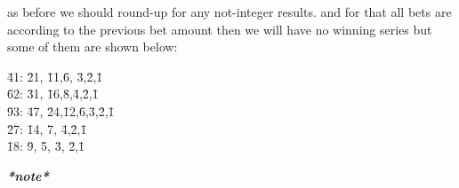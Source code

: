 \documentclass{article}
\begin{document}
as before we should round-up for any not-integer results.  and for that all bets are according to the previous bet amount then we will have no winning series but some of them are shown below:\\
\begin{tabbing}
\hspace*{5px}\=41:\hspace*{5px} \=21,\hspace*{5px} \=11,\hspace*{5px}\=6,\hspace*{5px} \=3,\hspace*{5px}\=2,\hspace*{5px}\=1\\
\hspace*{5px}\=62:\hspace*{5px} \=31,\hspace*{5px} \=16,\hspace*{5px}\=8,\hspace*{5px}\=4,\hspace*{5px}\=2,\hspace*{5px}\=1\\
\hspace*{5px}\=93:\hspace*{5px} \=47,\hspace*{5px} \=24,\hspace*{5px}\=12,\hspace*{5px}\=6,\hspace*{5px}\=3,\hspace*{5px}\=2,\hspace*{5px}\=1\\
\hspace*{5px}\=27:\hspace*{5px} \=14,\hspace*{5px} \=7,\hspace*{5px} \=4,\hspace*{5px}\=2,\hspace*{5px}\=1\\
\hspace*{5px}\=18:\hspace*{5px} \=9,\hspace*{5px} \=5,\hspace*{5px} \=3,\hspace*{5px} \=2,\hspace*{5px}\=1\\
\end{tabbing}

\begin{center}
\emph{\textbf{*note*}} \\
\end{center}
\end{document}
